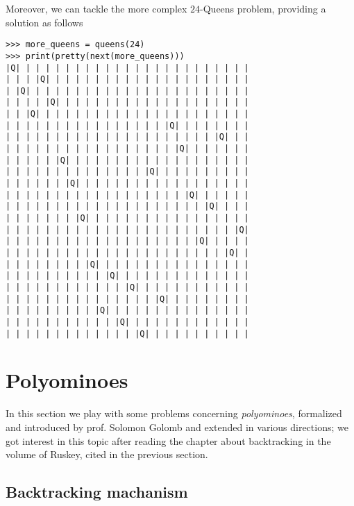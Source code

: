 Moreover, we can tackle the more complex $24$-Queens problem, providing a
solution as follows
\newpage
\begin{verbatim}
>>> more_queens = queens(24)
>>> print(pretty(next(more_queens)))
|Q| | | | | | | | | | | | | | | | | | | | | | | |
| | | |Q| | | | | | | | | | | | | | | | | | | | |
| |Q| | | | | | | | | | | | | | | | | | | | | | |
| | | | |Q| | | | | | | | | | | | | | | | | | | |
| | |Q| | | | | | | | | | | | | | | | | | | | | |
| | | | | | | | | | | | | | | | |Q| | | | | | | |
| | | | | | | | | | | | | | | | | | | | | |Q| | |
| | | | | | | | | | | | | | | | | |Q| | | | | | |
| | | | | |Q| | | | | | | | | | | | | | | | | | |
| | | | | | | | | | | | | | |Q| | | | | | | | | |
| | | | | | |Q| | | | | | | | | | | | | | | | | |
| | | | | | | | | | | | | | | | | | |Q| | | | | |
| | | | | | | | | | | | | | | | | | | | |Q| | | |
| | | | | | | |Q| | | | | | | | | | | | | | | | |
| | | | | | | | | | | | | | | | | | | | | | | |Q|
| | | | | | | | | | | | | | | | | | | |Q| | | | |
| | | | | | | | | | | | | | | | | | | | | | |Q| |
| | | | | | | | |Q| | | | | | | | | | | | | | | |
| | | | | | | | | | |Q| | | | | | | | | | | | | |
| | | | | | | | | | | | |Q| | | | | | | | | | | |
| | | | | | | | | | | | | | | |Q| | | | | | | | |
| | | | | | | | | |Q| | | | | | | | | | | | | | |
| | | | | | | | | | | |Q| | | | | | | | | | | | |
| | | | | | | | | | | | | |Q| | | | | | | | | | |
\end{verbatim}

\section{Polyominoes}


In this section we play with some problems concerning
\textit{polyominoes},
formalized and introduced by prof. Solomon Golomb and extended in various
directions; we got interest in this topic after reading the chapter about
backtracking in the volume of Ruskey, cited in the previous section.

\subsection{Backtracking machanism}

